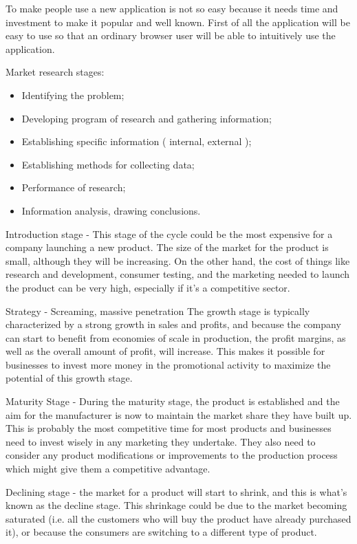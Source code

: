 To make people use a new application is not so easy because it needs time and investment to make it popular and well known. First of all the application will be easy to use so that an ordinary browser user will be able to intuitively use the application.

Market research stages:
\begin{itemize}
 \item Identifying the problem;
 \item Developing program of research and gathering information;
 \item Establishing specific information ( internal, external );
 \item Establishing methods for collecting data;
 \item Performance of research;
 \item Information analysis, drawing conclusions.
\end{itemize}

Introduction stage - This stage of the cycle could be the most expensive for a company launching a new product. The size of the market for the product is small, although they will be increasing. On the other hand, the cost of things like research and development, consumer testing, and the marketing needed to launch the product can be very high, especially if it's a competitive sector.

Strategy - Screaming, massive penetration The growth stage is typically characterized by a strong growth in sales and profits, and because the company can start to benefit from economies of scale in production, the profit margins, as well as the overall amount of profit, will increase. This makes it possible for businesses to invest more money in the promotional activity to maximize the potential of this growth stage.

Maturity Stage - During the maturity stage, the product is established and the aim for the manufacturer is now to maintain the market share they have built up. This is probably the most competitive time for most products and businesses need to invest wisely in any marketing they undertake. They also need to consider any product modifications or improvements to the production process which might give them a competitive advantage.

Declining stage - the market for a product will start to shrink, and this is what's known as the decline stage. This shrinkage could be due to the market becoming saturated (i.e. all the customers who will buy the product have already purchased it), or because the consumers are switching to a different type of product.


